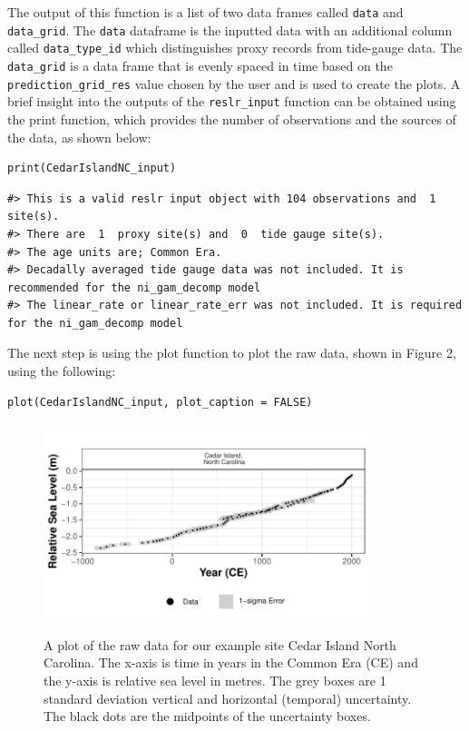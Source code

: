 \normalsize
The output of this function is a list of two data frames called \texttt{data} and \texttt{data\_grid}. The \texttt{data} dataframe is the inputted data with an additional column called \texttt{data\_type\_id} which distinguishes proxy records from tide-gauge data. The \texttt{data\_grid} is a data frame that is evenly spaced in time based on the \texttt{prediction\_grid\_res} value chosen by the user and is used to create the plots. A brief insight into the outputs of the \texttt{reslr\_input} function can be obtained using the print function, which provides the number of observations and the sources of the data, as shown below:
\scriptsize
\begin{verbatim}
print(CedarIslandNC_input)
\end{verbatim}
\begin{verbatim}
#> This is a valid reslr input object with 104 observations and  1 site(s).
#> There are  1  proxy site(s) and  0  tide gauge site(s).
#> The age units are; Common Era. 
#> Decadally averaged tide gauge data was not included. It is recommended for the ni_gam_decomp model 
#> The linear_rate or linear_rate_err was not included. It is required for the ni_gam_decomp model
\end{verbatim}
\normalsize
The next step is using the plot function to plot the raw data, shown in Figure 2, using the following:
\scriptsize
\begin{verbatim}
plot(CedarIslandNC_input, plot_caption = FALSE)
\end{verbatim}
\begin{figure}
{\centering \includegraphics[width=360px]{RJ-2024-018_files/figure-latex/plotdata-1} 
}
\caption{A plot of the raw data for our example site Cedar Island North Carolina. The x-axis is time in years in the Common Era (CE) and the y-axis is relative sea level in metres. The grey boxes are 1 standard deviation vertical and horizontal (temporal) uncertainty. The black dots are the midpoints of the uncertainty boxes.}\label{fig:plotdata}
\end{figure}
\normalsize
